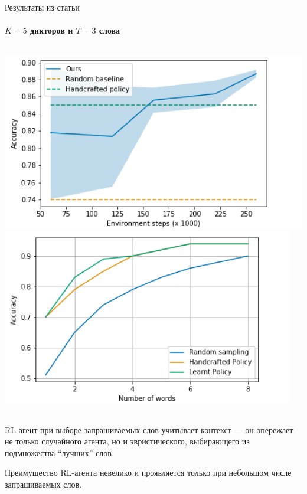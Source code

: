\documentclass[aspectratio=169]{beamer}
\begin{document}
\begin{frame}{Результаты из статьи}
    \framesubtitle{$K = 5$ дикторов и $T = 3$ слова}
    \begin{columns}
        \centering
        \includegraphics[scale=0.5]{isr_training.png}
        \includegraphics[scale=0.5]{isr_word_sweep.png}
    \end{columns}\vspace*{1em}

    RL-агент при выборе запрашиваемых слов учитывает контекст --- он опережает
    не только случайного агента, но и эвристического, выбирающего из
    подмножества ``лучших'' слов.\vspace*{1em}

    Преимущество RL-агента невелико и проявляется только при небольшом числе
    запрашиваемых слов.
\end{frame}
\end{document}
